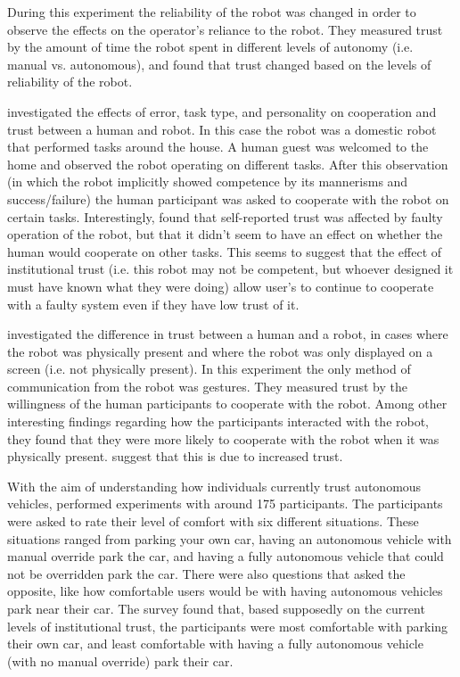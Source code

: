 During this experiment the reliability of the robot was changed in order to observe the effects on the operator's reliance to the robot. They measured trust by the amount of time the robot spent in different levels of autonomy (i.e. manual vs. autonomous), and found that trust changed based on the levels of reliability of the robot.

\citet{Salem2015-md} investigated the effects of error, task type, and personality on cooperation and trust between a human and robot. In this case the robot was a domestic robot that performed tasks around the house. A human guest was welcomed to the home and observed the robot operating on different tasks. After this observation (in which the robot implicitly showed competence by its mannerisms and success/failure) the human participant was asked to cooperate with the robot on certain tasks. Interestingly,  found that self-reported trust was affected by faulty operation of the robot, but that it didn't seem to have an effect on whether the human would cooperate on other tasks. This seems to suggest that the effect of institutional trust (i.e. this robot may not be competent, but whoever designed it must have known what they were doing) allow user's to continue to cooperate with a faulty system even if they have low trust of it.

\citet{Bainbridge2011-pl} investigated the difference in trust between a human and a robot,  in cases where the robot was physically present and where the robot was only displayed on a screen (i.e. not physically present). In this experiment the only method of communication from the robot was gestures. They measured trust by the willingness of the human participants to cooperate with the robot. Among other interesting findings regarding how the participants interacted with the robot, they found that they were more likely to cooperate with the robot when it was physically present. \citeauthor{Bainbridge2011-pl} suggest that this is due to increased trust. 

With the aim of understanding how individuals currently trust autonomous vehicles, \citet{Munjal_Desai2009-en} performed  experiments with around 175 participants. The participants were asked to rate their level of comfort with six different situations. These situations ranged from parking your own car, having an autonomous vehicle with manual override park the car, and having a fully autonomous vehicle that could not be overridden park the car. There were also questions that asked the opposite, like how comfortable users would be with having autonomous vehicles park near their car. The survey found that, based supposedly on the current levels of institutional trust, the participants were most comfortable with parking their own car, and least comfortable with having a fully autonomous vehicle (with no manual override) park their car. 

